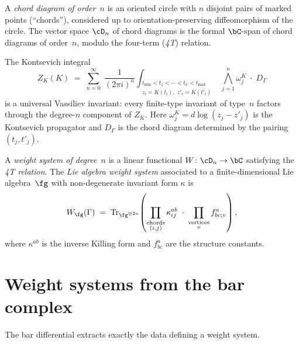 \begin{definition}
\label{def:chord-diagram}
A \emph{chord diagram of order~$n$} is an oriented circle with
$n$ disjoint pairs of marked points (``chords''), considered up to
orientation-preserving diffeomorphism of the circle. The vector
space $\cD_n$ of chord diagrams is the formal $\bC$-span of
chord diagrams of order~$n$, modulo the four-term
(\emph{4T}) relation.
\end{definition}

\begin{theorem}
\label{thm:kontsevich-invariant}
The Kontsevich integral
\[
Z_K(K) \;=\;
\sum_{n=0}^\infty \;
\frac{1}{(2\pi i)^n}
\int_{\substack{t_{\min} < t_1 < \cdots < t_n < t_{\max} \\
 z_i = K(t_i),\; z'_i = K(t'_i)}}
\bigwedge_{j=1}^n
\omega^K_{j}
\;\cdot\; D_\Gamma
\]
is a universal Vassiliev invariant: every finite-type invariant
of type~$n$ factors through the degree-$n$ component of $Z_K$.
Here $\omega^K_{j} = d\log(z_j - z'_j)$ is the Kontsevich
propagator and $D_\Gamma$ is the chord diagram determined by the
pairing $(t_j, t'_j)$.
\end{theorem}

\begin{definition}
\label{def:weight-system}
A \emph{weight system of degree~$n$} is a linear functional
$W\colon \cD_n \to \bC$ satisfying the \emph{4T relation}. The
\emph{Lie algebra weight system} associated to a finite-dimensional
Lie algebra~$\fg$ with non-degenerate invariant form $\kappa$ is
\[
W_\fg(\Gamma) \;=\;
\operatorname{Tr}_{\fg^{\otimes 2n}}
\!\left(
 \prod_{\substack{\text{chords}\\ (i,j)}} \kappa^{ab}_{ij}
 \;\cdot\;
 \prod_{\substack{\text{vertices}\\ v}} f^a_{bc;v}
\right),
\]
where $\kappa^{ab}$ is the inverse Killing form and $f^a_{bc}$ are
the structure constants.
\end{definition}

\section{Weight systems from the bar complex}
\label{sec:weight-systems-bar}

The bar differential extracts exactly the data defining a weight system.

